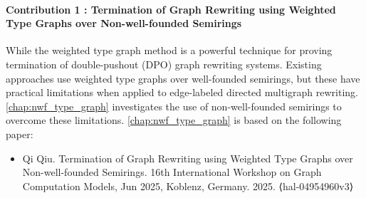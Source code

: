 
\paragraph{Contribution 1 : Termination of Graph Rewriting using Weighted Type Graphs over Non-well-founded Semirings} 
While the weighted type graph method is a powerful technique for proving termination of double-pushout (DPO) graph rewriting systems. 
Existing approaches use weighted type graphs over well-founded semirings, but these have practical limitations when applied to edge-labeled directed multigraph rewriting. \autoref{chap:nwf_type_graph} investigates the use of non-well-founded semirings to overcome these limitations. \autoref{chap:nwf_type_graph} is based on the following paper:
\begin{itemize}
    \item Qi Qiu. Termination of Graph Rewriting using Weighted Type Graphs over Non-well-founded Semirings. 16th International Workshop on Graph Computation Models, Jun 2025, Koblenz, Germany. 2025. ⟨hal-04954960v3⟩
\end{itemize}
 
